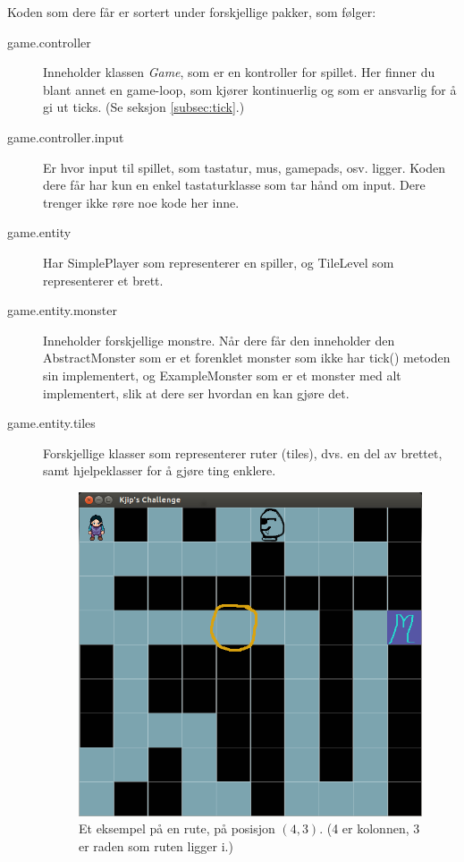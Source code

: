 \documentclass[norsk]{article}
\begin{document}
Koden som dere får er sortert under forskjellige pakker, som følger:
\begin{description}
\item [game.controller] Inneholder klassen \emph{Game}, som er en kontroller for spillet.
  Her finner du blant annet en game-loop, som kjører kontinuerlig og som er ansvarlig for å gi ut ticks. (Se seksjon \ref{subsec:tick}.)
\item [game.controller.input] Er hvor input til spillet, som tastatur, mus, gamepads, osv. ligger. Koden dere får har kun en enkel tastaturklasse som tar hånd om input. Dere trenger ikke røre noe kode her inne.
\item [game.entity] Har SimplePlayer som representerer en spiller, og TileLevel som representerer et brett.
\item [game.entity.monster] Inneholder forskjellige monstre. Når dere får den inneholder den AbstractMonster som er et forenklet monster som ikke har tick() metoden sin implementert, og ExampleMonster som er et monster med alt implementert, slik at dere ser hvordan en kan gjøre det.
\item [game.entity.tiles] Forskjellige klasser som representerer ruter (tiles), dvs. en del av brettet, samt hjelpeklasser for å gjøre ting enklere.
  \begin{figure}[h!]
    \caption{Et eksempel på en rute, på posisjon $(4,3)$. (4 er kolonnen, 3 er raden som ruten ligger i.)}
    \centering
    \includegraphics[width=1\textwidth]{eksempel-pa-brett.png}

\end{figure}
\end{description}
\end{document}

